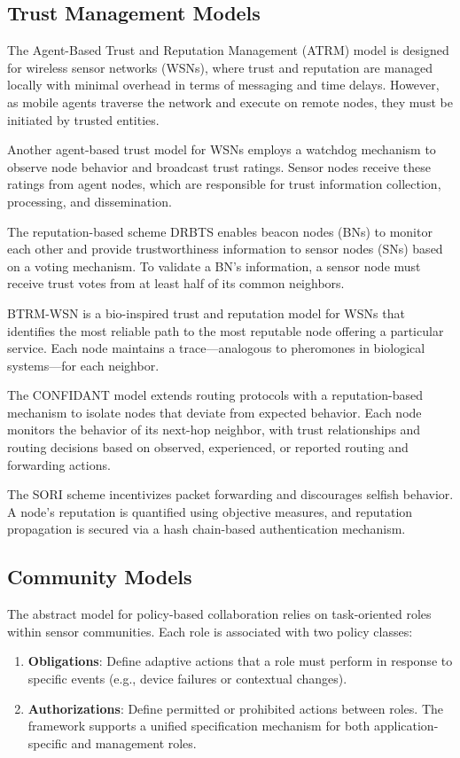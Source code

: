 \subsection{Trust Management Models}
The Agent-Based Trust and Reputation Management (ATRM) model \cite{Boukerch2007} is designed for wireless sensor networks (WSNs), where trust and reputation are managed locally with minimal overhead in terms of messaging and time delays. However, as mobile agents traverse the network and execute on remote nodes, they must be initiated by trusted entities.

Another agent-based trust model for WSNs \cite{Chen2007} employs a watchdog mechanism to observe node behavior and broadcast trust ratings. Sensor nodes receive these ratings from agent nodes, which are responsible for trust information collection, processing, and dissemination.

The reputation-based scheme DRBTS \cite{Srinivasan2006} enables beacon nodes (BNs) to monitor each other and provide trustworthiness information to sensor nodes (SNs) based on a voting mechanism. To validate a BN's information, a sensor node must receive trust votes from at least half of its common neighbors.

BTRM-WSN \cite{Marmol2011} is a bio-inspired trust and reputation model for WSNs that identifies the most reliable path to the most reputable node offering a particular service. Each node maintains a trace—analogous to pheromones in biological systems—for each neighbor.

The CONFIDANT model \cite{Buchegger2002} extends routing protocols with a reputation-based mechanism to isolate nodes that deviate from expected behavior. Each node monitors the behavior of its next-hop neighbor, with trust relationships and routing decisions based on observed, experienced, or reported routing and forwarding actions.

The SORI scheme \cite{He2004} incentivizes packet forwarding and discourages selfish behavior. A node's reputation is quantified using objective measures, and reputation propagation is secured via a hash chain-based authentication mechanism.

\subsection{Community Models}
The abstract model \cite{Schaeffer2008} for policy-based collaboration relies on task-oriented roles within sensor communities. Each role is associated with two policy classes:
\begin{enumerate}
 \item \textbf{Obligations}: Define adaptive actions that a role must perform in response to specific events (e.g., device failures or contextual changes).
 \item \textbf{Authorizations}: Define permitted or prohibited actions between roles. The framework supports a unified specification mechanism for both application-specific and management roles.
\end{enumerate}


